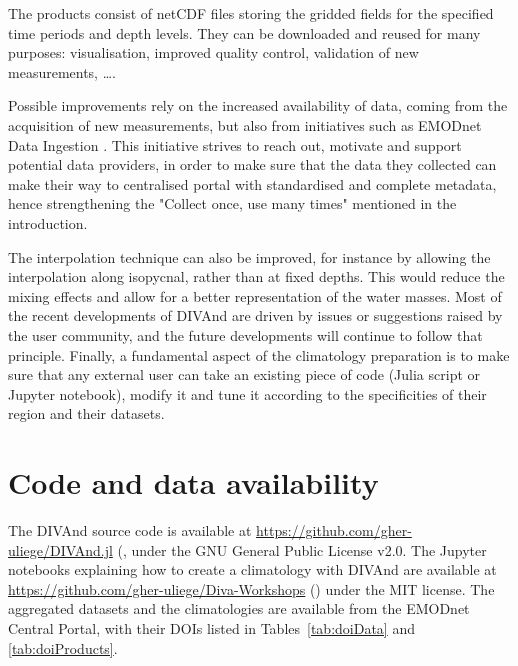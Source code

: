 \documentclass[essd,manuscript]{copernicus}
\begin{document}
The products consist of netCDF files storing the gridded fields for the specified time periods and depth levels. They can be downloaded and reused for many purposes: visualisation, improved quality control, validation of new measurements, \ldots. 

Possible improvements rely on the increased availability of data, coming from the acquisition of new measurements, but also from initiatives such as EMODnet Data Ingestion \citep{IONA2024}. This initiative strives to reach out, motivate and support potential data providers, in order to make sure that the data they collected can make their way to centralised portal with standardised and complete metadata, hence strengthening the "Collect once, use many times" mentioned in the introduction. 

The interpolation technique can also be improved, for instance by allowing the interpolation along isopycnal, rather than at fixed depths. This would reduce the mixing effects and allow for a better representation of the water masses. Most of the recent developments of DIVAnd are driven by issues or suggestions raised by the user community, and the future developments will continue to follow that principle. Finally, a fundamental aspect of the climatology preparation is to make sure that any external user can take an existing piece of code (Julia script or Jupyter notebook), modify it and tune it according to the specificities of their region and their datasets. 


\section{Code and data availability}

The DIVAnd source code is available at \url{https://github.com/gher-uliege/DIVAnd.jl} (, under the GNU General Public License v2.0. The Jupyter notebooks explaining how to create a climatology with DIVAnd are available at \url{https://github.com/gher-uliege/Diva-Workshops} () under the MIT license. The aggregated datasets and the climatologies are available from the EMODnet Central Portal, with their DOIs listed in Tables~\ref{tab:doiData} and \ref{tab:doiProducts}. 
\end{document}
